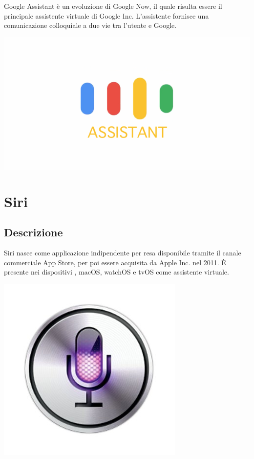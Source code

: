 \documentclass[a4paper,titlepage]{article}
\begin{document}
\begin{minipage}{0.7\textwidth}\raggedright
	Google Assistant è un evoluzione di Google Now, il quale risulta essere il principale assistente virtuale di Google Inc. L'assistente fornisce una comunicazione colloquiale a due vie tra l'utente e Google.
\end{minipage}
\hfill
\noindent\begin{minipage}{0.2\textwidth}
	\includegraphics[scale=0.3]{images/ga.png}
\end{minipage}

\section{Siri}
\subsection{Descrizione}

\begin{minipage}{0.7\textwidth}\raggedright
	Siri nasce come applicazione indipendente per  resa disponibile tramite il canale commerciale App Store, per poi essere acquisita da Apple Inc. nel 2011. È presente nei dispositivi , macOS, watchOS e tvOS come assistente virtuale.
\end{minipage}
\hfill
\noindent\begin{minipage}{0.1\textwidth}
	\includegraphics[scale=0.3]{images/siri.jpg}
\end{minipage}
\end{document}
